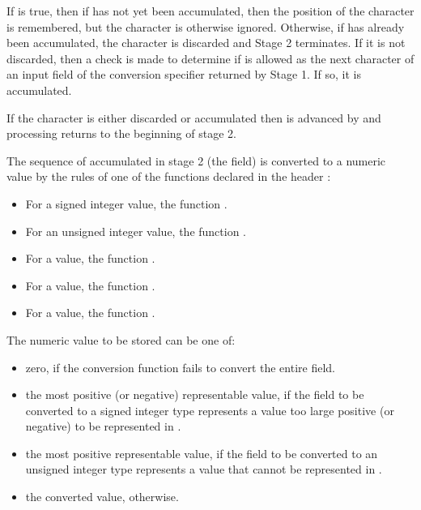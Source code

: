 \begin{itemdescr}
\begin{description}
If  is true, then if
has not yet been accumulated, then the position of the character is remembered,
but the character is otherwise ignored.
Otherwise, if
has already been accumulated, the character is discarded and
Stage 2 terminates.
If it is not discarded, then a check is made to determine if  is
allowed as the next character of an input field of the conversion specifier
returned by Stage 1. If so, it is accumulated.

If the character is either discarded or accumulated then 
is advanced by
and processing returns to the beginning of stage 2.

The sequence of  accumulated in stage 2 (the field) is converted to a numeric value by the rules of one of the functions declared in the header :

\begin{itemize}
\item For a signed integer value, the function .

\item For an unsigned integer value, the function .

\item For a  value, the function .

\item For a  value, the function .

\item For a  value, the function .
\end{itemize}

The numeric value to be stored can be one of:

\begin{itemize}
\item zero, if the conversion function fails to convert the entire field.

\item the most positive (or negative) representable value,
if the field to be converted to a signed integer type represents a value
too large positive (or negative) to be represented in .

\item the most positive representable value,
if the field to be converted to an unsigned integer type represents a value
that cannot be represented in .

\item the converted value, otherwise.
\end{itemize}


\end{description}
\end{itemdescr}
